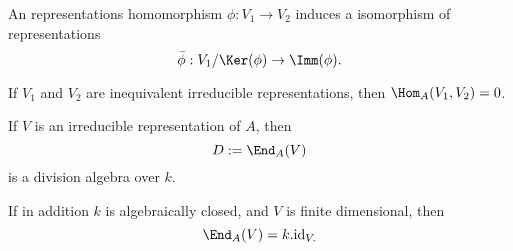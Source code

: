 \begin{thm}
An representations homomorphism \(\phi :V_{1}\rightarrow V_{2}\) induces a isomorphism of representations 
\[\bar{\phi } : V_{1}/\Ker(\phi ) \rightarrow  \Imm(\phi ).\]
\end{thm}

\begin{thm}
If \(V_{1}\) and \(V_{2}\) are inequivalent irreducible representations, then \(\Hom_A(V_{1},V_{2})=0\).
\end{thm}

\begin{thm}
If \(V\) is an irreducible representation of \(A\), then 
\[D:=\End_{A} (V)\]
is a division algebra over $k$.   

If in addition \(k\) is algebraically closed, and \(V\) is finite dimensional, then
\[\End_{A} (V) =k.\text{id}_{V.}\]
\end{thm}



